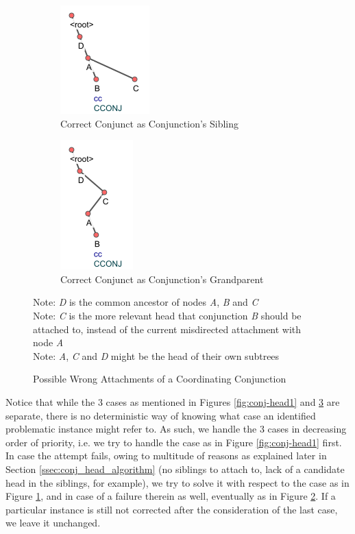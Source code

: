 \begin{figure}[H]
\begin{subfigure}{.45\textwidth}
  \centering
  \includegraphics{img/nested2.png}
  \caption{Correct Conjunct as Conjunction's Sibling}
  \label{fig:conj-head2}
  \end{subfigure}
\begin{subfigure}{.5\textwidth}
  \centering
  \includegraphics{img/nested3.png}
  \caption{Correct Conjunct as Conjunction's Grandparent}
  \label{fig:conj-head3}
\end{subfigure}
\caption{Possible Wrong Attachments of a Coordinating Conjunction}
Note: \textit{D} is the common ancestor of nodes \textit{A}, \textit{B} and \textit{C}\\
Note: \textit{C} is the more relevant head that conjunction \textit{B} should be attached to, instead of the current misdirected attachment with node \textit{A}\\
Note: \textit{A}, \textit{C} and \textit{D} might be the head of their own subtrees
\label{fig:conj-head23}
\end{figure}

Notice that while the 3 cases as mentioned in Figures \ref{fig:conj-head1} and \ref{fig:conj-head23} are separate, there is no deterministic way of knowing what case an identified problematic instance might refer to. As such, we handle the 3 cases in decreasing order of priority, i.e. we try to handle the case as in Figure \ref{fig:conj-head1} first. In case the attempt fails, owing to multitude of reasons as explained later in Section \ref{ssec:conj_head_algorithm} (no siblings to attach to, lack of a candidate head in the siblings, for example), we try to solve it with respect to the case as in Figure \ref{fig:conj-head2}, and in case of a failure therein as well, eventually as in Figure \ref{fig:conj-head3}. If a particular instance is still not corrected after the consideration of the last case, we leave it unchanged.

